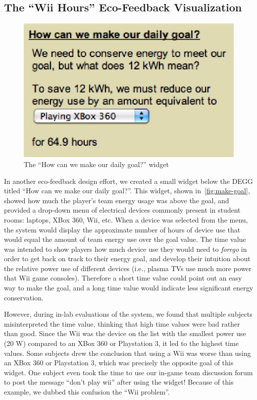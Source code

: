 \documentclass{sigchi}
\begin{document}

\subsection{The ``Wii Hours'' Eco-Feedback Visualization}

\begin{figure}[!tb]
	\centering
	\includegraphics[width=0.6\columnwidth]{how-meet-goal.eps}
	\caption{The ``How can we make our daily goal?'' widget}
	\label{fig:make-goal}
\end{figure}

In another eco-feedback design effort, we created a small widget below the DEGG titled ``How can we make our daily goal?''. This widget, shown in~\autoref{fig:make-goal}, showed how much the player's team energy usage was above the goal, and provided a drop-down menu of electrical devices commonly present in student rooms: laptops, XBox 360, Wii, etc. When a device was selected from the menu, the system would display the approximate number of hours of device use that would equal the amount of team energy use over the goal value. The time value was intended to show players how much device use they would need to \emph{forego} in order to get back on track to their energy goal, and develop their intuition about the relative power use of different devices (i.e., plasma TVs use much more power that Wii game consoles). Therefore a short time value could point out an easy way to make the goal, and a long time value would indicate less significant energy conservation.

However, during in-lab evaluations of the system, we found that multiple subjects misinterpreted the time value, thinking that high time values were bad rather than good. Since the Wii was the device on the list with the smallest power use (20 W) compared to an XBox 360 or Playstation 3, it led to the highest time values. Some subjects drew the conclusion that using a Wii was worse than using an XBox 360 or Playstation 3, which was precisely the opposite goal of this widget. One subject even took the time to use our in-game team discussion forum to post the message ``don't play wii'' after using the widget! Because of this example, we dubbed this confusion the ``Wii problem''.
\end{document}

